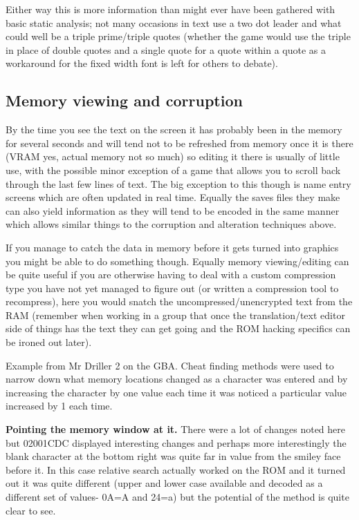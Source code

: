 \documentclass[
]{book}
\begin{document}
Either way this is more information than might ever have been gathered with basic static analysis; not many occasions in text use a two dot leader and what could well be a triple prime/triple quotes (whether the game would use the triple in place of double quotes and a single quote for a quote within a quote as a workaround for the fixed width font is left for others to debate).

\hypertarget{memory-viewing-and-corruption}{%
\subsection{Memory viewing and corruption}\label{memory-viewing-and-corruption}}

By the time you see the text on the screen it has probably been in the memory for several seconds and will tend not to be refreshed from memory once it is there (VRAM yes, actual memory not so much) so editing it there is usually of little use, with the possible minor exception of a game that allows you to scroll back through the last few lines of text. The big exception to this though is name entry screens which are often updated in real time. Equally the saves files they make can also yield information as they will tend to be encoded in the same manner which allows similar things to the corruption and alteration techniques above.

If you manage to catch the data in memory before it gets turned into graphics you might be able to do something though. Equally memory viewing/editing can be quite useful if you are otherwise having to deal with a custom compression type you have not yet managed to figure out (or written a compression tool to recompress), here you would snatch the uncompressed/unencrypted text from the RAM (remember when working in a group that once the translation/text editor side of things has the text they can get going and the ROM hacking specifics can be ironed out later).

Example from Mr Driller 2 on the GBA. Cheat finding methods were used to narrow down what memory locations changed as a character was entered and by increasing the character by one value each time it was noticed a particular value increased by 1 each time.

\textbf{Pointing the memory window at it.} There were a lot of changes noted here but 02001CDC displayed interesting changes and perhaps more interestingly the blank character at the bottom right was quite far in value from the smiley face before it. In this case relative search actually worked on the ROM and it turned out it was quite different (upper and lower case available and decoded as a different set of values- 0A=A and 24=a) but the potential of the method is quite clear to see.
\end{document}
